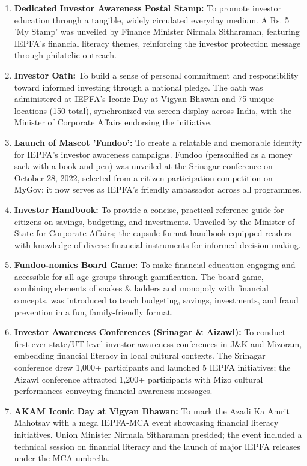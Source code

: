 \documentclass[openany]{book}
\begin{document}
\begin{enumerate}
    \item \textbf{Dedicated Investor Awareness Postal Stamp:} To promote investor education through a tangible, widely circulated everyday medium. A Rs. 5 'My Stamp' was unveiled by Finance Minister Nirmala Sitharaman, featuring IEPFA's financial literacy themes, reinforcing the investor protection message through philatelic outreach.
    \item \textbf{Investor Oath:} To build a sense of personal commitment and responsibility toward informed investing through a national pledge. The oath was administered at IEPFA's Iconic Day at Vigyan Bhawan and 75 unique locations (150 total), synchronized via screen display across India, with the Minister of Corporate Affairs endorsing the initiative.
    \item \textbf{Launch of Mascot 'Fundoo':} To create a relatable and memorable identity for IEPFA's investor awareness campaigns. Fundoo (personified as a money sack with a book and pen) was unveiled at the Srinagar conference on October 28, 2022, selected from a citizen-participation competition on MyGov; it now serves as IEPFA's friendly ambassador across all programmes.
    \item \textbf{Investor Handbook:} To provide a concise, practical reference guide for citizens on savings, budgeting, and investments. Unveiled by the Minister of State for Corporate Affairs; the capsule-format handbook equipped readers with knowledge of diverse financial instruments for informed decision-making.
    \item \textbf{Fundoo-nomics Board Game:} To make financial education engaging and accessible for all age groups through gamification. The board game, combining elements of snakes \& ladders and monopoly with financial concepts, was introduced to teach budgeting, savings, investments, and fraud prevention in a fun, family-friendly format.
    \item \textbf{Investor Awareness Conferences (Srinagar \& Aizawl):} To conduct first-ever state/UT-level investor awareness conferences in J\&K and Mizoram, embedding financial literacy in local cultural contexts. The Srinagar conference drew 1,000+ participants and launched 5 IEPFA initiatives; the Aizawl conference attracted 1,200+ participants with Mizo cultural performances conveying financial awareness messages.
    \item \textbf{AKAM Iconic Day at Vigyan Bhawan:} To mark the Azadi Ka Amrit Mahotsav with a mega IEPFA-MCA event showcasing financial literacy initiatives. Union Minister Nirmala Sitharaman presided; the event included a technical session on financial literacy and the launch of major IEPFA releases under the MCA umbrella.

\end{enumerate}
\end{document}
